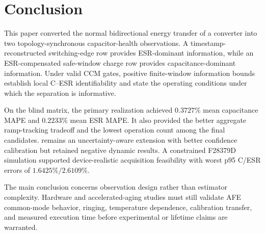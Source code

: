 \section{Conclusion}
\label{sec:conclusion}

This paper converted the normal bidirectional energy transfer of a \Cuk{} converter into two topology-synchronous capacitor-health observations. A timestamp-reconstructed switching-edge row provides ESR-dominant information, while an ESR-compensated safe-window charge row provides capacitance-dominant information. Under valid CCM gates, positive finite-window information bounds establish local C--ESR identifiability and state the operating conditions under which the separation is informative.

On the blind matrix, the primary \TSRLS{} realization achieved $0.3727\%$ mean capacitance MAPE and $0.2233\%$ mean ESR MAPE. It also provided the better aggregate ramp-tracking tradeoff and the lowest operation count among the final candidates. \TSKF{} remains an uncertainty-aware extension with better confidence calibration but retained negative dynamic results. A constrained F28379D simulation supported device-realistic acquisition feasibility with worst p95 C/ESR errors of $1.6425\%/2.6109\%$.

The main conclusion concerns observation design rather than estimator complexity. Hardware and accelerated-aging studies must still validate AFE common-mode behavior, ringing, temperature dependence, calibration transfer, and measured execution time before experimental or lifetime claims are warranted.
